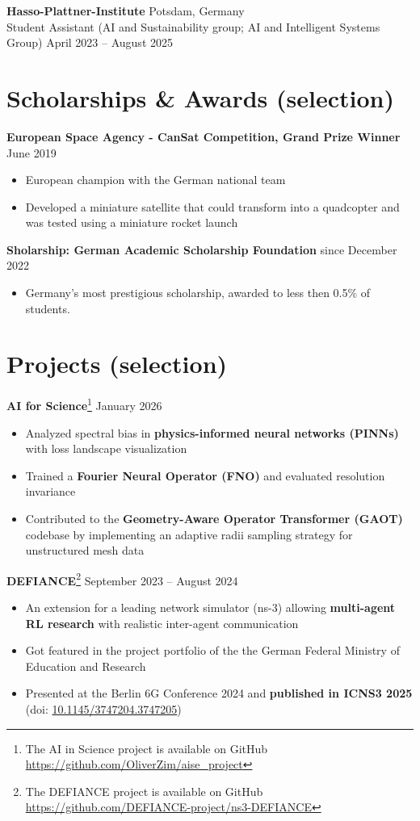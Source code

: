 \textbf{Hasso-Plattner-Institute} \hfill Potsdam, Germany \\
Student Assistant (AI and Sustainability group; AI and Intelligent Systems Group) \hfill April 2023 -- August 2025

\section*{Scholarships \& Awards (selection)}
\textbf{European Space Agency - CanSat Competition, Grand Prize Winner} \hfill June 2019
\begin{itemize}[noitemsep, topsep=2pt]
    \item European champion with the German national team
    \item Developed a miniature satellite that could transform into a quadcopter and was tested using a miniature rocket launch
\end{itemize}

\textbf{Sholarship: German Academic Scholarship Foundation} \hfill since December 2022
\begin{itemize}[noitemsep, topsep=2pt]
    \item Germany's most prestigious scholarship, awarded to less then 0.5\% of students.
\end{itemize}

\section*{Projects (selection)}
\textbf{AI for Science}\footnote{The AI in Science project is available on GitHub \url{https://github.com/OliverZim/aise_project}} \hfill January 2026
\begin{itemize}[noitemsep, topsep=2pt]
    \item Analyzed spectral bias in \textbf{physics-informed neural networks (PINNs)} with loss landscape visualization
    \item Trained a \textbf{Fourier Neural Operator (FNO)} and evaluated resolution invariance
    \item Contributed to the \textbf{Geometry-Aware Operator Transformer (GAOT)} codebase by implementing an adaptive radii sampling strategy for unstructured mesh data
\end{itemize}

\textbf{DEFIANCE}\footnote{The DEFIANCE project is available on GitHub \url{https://github.com/DEFIANCE-project/ns3-DEFIANCE}} \hfill September 2023 -- August 2024
\begin{itemize}[noitemsep, topsep=2pt]
    \item An extension for a leading network simulator (ns-3) allowing \textbf{multi-agent RL research} with realistic inter-agent communication
    \item Got featured in the project portfolio of the the German Federal Ministry of Education and Research
    \item Presented at the Berlin 6G Conference 2024 and \textbf{published in ICNS3 2025} (doi: \href{https://doi.org/10.1145/3747204.3747205}{10.1145/3747204.3747205})
\end{itemize}

